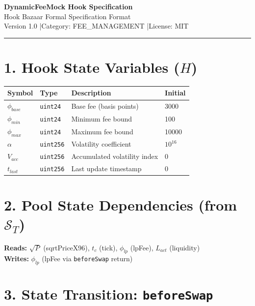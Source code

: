 \documentclass[11pt,a4paper]{article}
\begin{document}
\begin{center}
\Large\textbf{DynamicFeeMock Hook Specification}\\[0.3em]
\normalsize Hook Bazaar Formal Specification Format\\[0.2em]
\small Version 1.0 \quad|\quad Category: FEE\_MANAGEMENT \quad|\quad License: MIT
\end{center}

\vspace{0.5em}
\hrule
\vspace{0.5em}

\section*{1. Hook State Variables ($H$)}

\begin{center}
\begin{tabular}{llll}
\toprule
\textbf{Symbol} & \textbf{Type} & \textbf{Description} & \textbf{Initial} \\
\midrule
$\phi_{base}$ & \texttt{uint24} & Base fee (basis points) & 3000 \\
$\phi_{min}$ & \texttt{uint24} & Minimum fee bound & 100 \\
$\phi_{max}$ & \texttt{uint24} & Maximum fee bound & 10000 \\
$\alpha$ & \texttt{uint256} & Volatility coefficient & $10^{16}$ \\
$V_{acc}$ & \texttt{uint256} & Accumulated volatility index & 0 \\
$t_{last}$ & \texttt{uint256} & Last update timestamp & 0 \\
\bottomrule
\end{tabular}
\end{center}

\section*{2. Pool State Dependencies (from $\mathcal{S}_T$)}

\textbf{Reads:} $\sqrt{P}$ (sqrtPriceX96), $t_c$ (tick), $\phi_{lp}$ (lpFee), $L_{act}$ (liquidity)\\
\textbf{Writes:} $\phi_{lp}$ (lpFee via \texttt{beforeSwap} return)

\section*{3. State Transition: \texttt{beforeSwap}}
\end{document}
